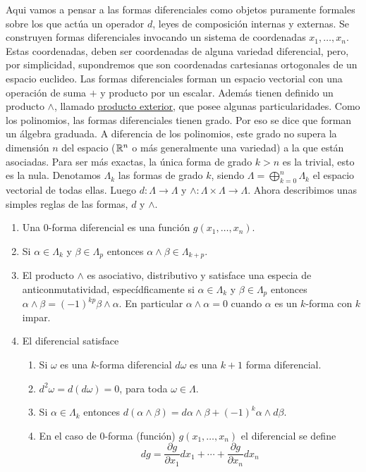 \begin{subappendices}
Aqui vamos a pensar a las formas diferenciales como objetos puramente formales sobre los que actúa un operador $d$, leyes de composición internas y externas. Se construyen formas diferenciales invocando un sistema de coordenadas $x_1,\ldots,x_n$. Estas coordenadas, deben ser coordenadas de alguna variedad diferencial, pero, por simplicidad, supondremos que son coordenadas cartesianas ortogonales de un espacio euclideo. Las formas diferenciales forman un espacio vectorial con una operación de suma $+$ y producto por un escalar. Además tienen definido un producto $\wedge$, llamado \href{https://es.wikipedia.org/wiki/Producto_exterior}{producto exterior}, que posee  algunas particularidades.  Como los polinomios, las formas diferenciales tienen grado. Por eso se dice que forman un álgebra graduada. A diferencia de los polinomios, este grado no supera la dimensión $n$ del espacio ($\mathbb{R}^n$ o más generalmente una variedad) a la que están asociadas. Para ser más exactas, la única forma de 
grado $k>n$ es la trivial, esto es la nula. Denotamos $\Lambda_k$ las formas de grado $k$, siendo $\Lambda =\bigoplus_{k=0}^{n}\Lambda_k$ el espacio vectorial de todas ellas. Luego $d:\Lambda\to\Lambda$ y $\wedge:\Lambda\times\Lambda\to \Lambda$. Ahora describimos unas simples reglas de las formas,  $d$ y $\wedge$.



\begin{enumerate}
   \item Una 0-forma diferencial es una función $g(x_1,\ldots,x_n)$.

  \item Si $\alpha\in\Lambda_k$ y $\beta\in\Lambda_p$ entonces $\alpha \wedge \beta\in \Lambda_{k+p}$.
  \item El producto $\wedge$ es asociativo, distributivo y satisface una especia de anticonmutatividad, especídficamente si $\alpha\in\Lambda_k$ y $\beta\in\Lambda_p$ entonces $\alpha\wedge \beta=(-1)^{kp}\beta\wedge\alpha$. En particular $\alpha\wedge\alpha=0$ cuando $\alpha$ es un $k$-forma con $k$ impar.
  \item El diferencial satisface
  \begin{enumerate}
    \item Si $\omega$ es una $k$-forma diferencial $d\omega$ es una $k+1$ forma diferencial.
    \item  $d^2\omega=d(d\omega)=0$, para toda $\omega\in\Lambda$.
    \item Si $\alpha\in\Lambda_k$ entonces  $d(\alpha\wedge\beta)=d\alpha\wedge\beta+(-1)^k\alpha\wedge d\beta$.
    \item En el caso de $0$-forma (función) $g(x_1,\ldots,x_n)$ el diferencial se define
    \[dg=\frac{\partial g}{\partial x_1}dx_1+\cdots+\frac{\partial g}{\partial x_n}dx_n\]


\end{enumerate}
\end{enumerate}
\end{subappendices}
